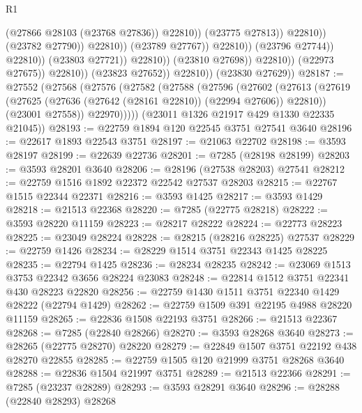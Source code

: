 \begin{lexlean}{R1}
\begin{coremodule}
                                                          (@27866 @28103 (@23768 @27836))
                                                          @22810))
                                                      (@23775 @27813))
                                                    @22810))
                                                (@23782 @27790))
                                              @22810))
                                          (@23789 @27767))
                                        @22810))
                                    (@23796 @27744))
                                  @22810))
                              (@23803 @27721))
                            @22810))
                        (@23810 @27698))
                      @22810))
                  (@22973 @27675))
                @22810))
            (@23823 @27652))
          @22810))
      (@23830 @27629))
@28187 := @27552
    (@27568
      (@27576
        (@27582
          (@27588
            (@27596
              (@27602
                (@27613
                  (@27619 (@27625 (@27636 (@27642 (@28161 @22810)) (@22994 @27606)) @22810))
                  (@23001 @27558))
                @22970)))))
      (@23011 @1326 @21917 @429 @1330 @22335 @21045))
@28193 := @22759 @1894 @120 @22545 @3751 @27541 @3640
@28196 := @22617 @1893 @22543 @3751
@28197 := @21063 @22702
@28198 := @3593 @28197
@28199 := @22639 @22736
@28201 := @7285 (@28198 @28199)
@28203 := @3593 @28201 @3640
@28206 := @28196 (@27538 @28203) @27541
@28212 := @22759 @1516 @1892 @22372 @22542 @27537 @28203
@28215 := @22767 @1515 @22344 @22371
@28216 := @3593 @1425
@28217 := @3593 @1429
@28218 := @21513 @22368
@28220 := @7285 (@22775 @28218)
@28222 := @3593 @28220 @11159
@28223 := @28217 @28222
@28224 := @22773 @28223
@28225 := @23049 @28224
@28228 := @28215 (@28216 @28225) @27537
@28229 := @22759 @1426
@28234 := @28229 @1514 @3751 @22343 @1425 @28225
@28235 := @22794 @1425
@28236 := @28234 @28235
@28242 := @23069 @1513 @3753 @22342 @3656 @28224 @23083
@28248 := @22814 @1512 @3751 @22341 @430 @28223 @22820
@28256 := @22759 @1430 @1511 @3751 @22340 @1429 @28222 (@22794 @1429)
@28262 := @22759 @1509 @391 @22195 @4988 @28220 @11159
@28265 := @22836 @1508 @22193 @3751
@28266 := @21513 @22367
@28268 := @7285 (@22840 @28266)
@28270 := @3593 @28268 @3640
@28273 := @28265 (@22775 @28270) @28220
@28279 := @22849 @1507 @3751 @22192 @438 @28270 @22855
@28285 := @22759 @1505 @120 @21999 @3751 @28268 @3640
@28288 := @22836 @1504 @21997 @3751
@28289 := @21513 @22366
@28291 := @7285 (@23237 @28289)
@28293 := @3593 @28291 @3640
@28296 := @28288 (@22840 @28293) @28268

\end{coremodule}
\end{lexlean}

